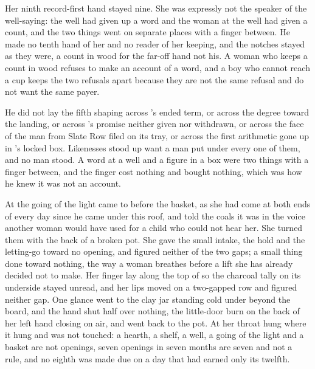 Her ninth record-first hand stayed nine. She was expressly not the speaker of the well-saying: the well had given up a word and the woman at the well had given a count, and the two things went on separate places with a finger between. He made no tenth hand of her and no reader of her keeping, and the notches stayed as they were, a count in wood for the far-off hand not his. A woman who keeps a count in wood refuses to make an account of a word, and a boy who cannot reach a cup keeps the two refusals apart because they are not the same refusal and do not want the same payer.

He did not lay the fifth shaping across 's ended term, or across the degree toward the landing, or across 's promise neither given nor withdrawn, or across the face of the man from Slate Row filed on its tray, or across the first arithmetic gone up  in 's locked box. Likenesses stood up want a man put under every one of them, and no man stood. A word at a well and a figure in a box were two things with a finger between, and the finger cost nothing and bought nothing, which was how he knew it was not an account.

At the going of the light  came to  before the basket, as she had come at both ends of every day since he came under this roof, and told the coals it was  in the voice another woman would have used for a child who could not hear her. She turned them with the back of a broken pot. She gave the small intake, the hold and the letting-go toward no opening, and figured neither of the two gaps; a small thing done toward nothing, the way a woman breathes before a lift she has already decided not to make. Her finger lay along the top of  so the charcoal tally on its underside stayed unread, and her lips moved on a two-gapped row and figured neither gap. One glance went to the clay jar standing cold under  beyond the board, and the hand shut half over nothing, the little-door burn on the back of her left hand closing on air, and went back to the pot. At her throat  hung where it hung and was not touched: a hearth, a shelf, a well, a going of the light and a basket are not openings, seven openings in seven months are seven and not a rule, and no eighth was made due on a day that had earned only its twelfth.

